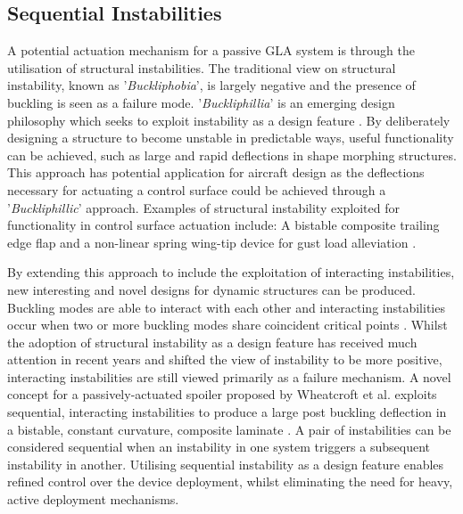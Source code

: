 \documentclass{IEEEtran}
\begin{document}
		\subsection{Sequential Instabilities}
		A potential actuation mechanism for a passive GLA system is through the utilisation of structural instabilities. The traditional view on structural instability, known as '\textit{Buckliphobia}', is largely negative and the presence of buckling is seen as a failure mode. '\textit{Buckliphillia}' is an emerging design philosophy which seeks to exploit instability as a design feature \cite{Reis_2015}. By deliberately designing a structure to become unstable in predictable ways, useful functionality can be achieved, such as large and rapid deflections in shape morphing structures. This approach has potential application for aircraft design as the deflections necessary for actuating a control surface could be achieved through a '\textit{Buckliphillic}' approach. Examples of structural instability exploited for functionality in control surface actuation include: A bistable composite trailing edge flap \cite{Daynes2010} and a non-linear spring wing-tip device for gust load alleviation \cite{Castrichini2017}.
		
         By extending this approach to include the exploitation of interacting instabilities, new interesting and novel designs for dynamic structures can be produced. Buckling modes are able to interact with each other and interacting instabilities occur when two or more buckling modes share coincident critical points \cite{Wheatcroft_2023}. Whilst the adoption of structural instability as a design feature has received much attention in recent years and shifted the view of instability to be more positive, interacting instabilities are still viewed primarily as a failure mechanism. A novel concept for a passively-actuated spoiler proposed by Wheatcroft et al. exploits sequential, interacting instabilities to produce a large post buckling deflection in a bistable, constant curvature, composite laminate \cite{Wheatcroft_2023}. A pair of instabilities can be considered sequential when an instability in one system triggers a subsequent instability in another. Utilising sequential instability as a design feature enables refined control over the device deployment, whilst eliminating the need for heavy, active deployment mechanisms.
		
\end{document}
